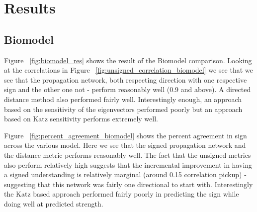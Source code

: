 \documentclass{article}
\begin{document}
\section{Results}

\subsection{Biomodel}

Figure ~\ref{fig:biomodel_res} shows the result of the Biomodel comparison. Looking at the correlations in Figure  ~\ref{fig:unsigned_correlation_biomodel} we see that we see that the propagation network, both respecting direction with one respective sign and the other one not - perform reasonably well (0.9 and above). A directed distance method also performed fairly well. Interestingly enough, an approach based on the sensitivity of the eigenvectors performed poorly but an approach based on Katz sensitivity performs extremely well.  

Figure ~\ref{fig:percent_agreement_biomodel} shows the percent agreement in sign across the various model. Here we see that the signed propagation network and the distance metric performs reasonably well. The fact that the unsigned metrics also perform relatively high suggests that the incremental improvement in having a signed understanding is relatively marginal (around 0.15 correlation pickup) - suggesting that this network was fairly one directional to start with. Interestingly the Katz based approach performed fairly poorly in predicting the sign while doing well at predicted strength. 
\end{document}
